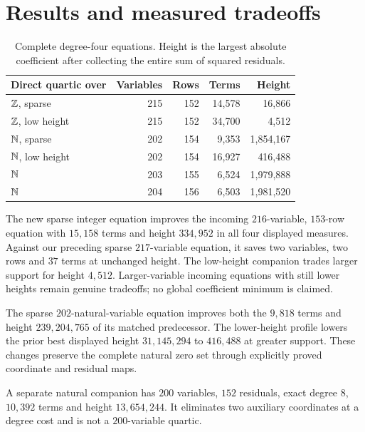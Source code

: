 \section{Results and measured tradeoffs}
\begin{table}[ht]
\centering\small
\begin{tabular}{lrrrr}
\toprule
Direct quartic over & Variables & Rows & Terms & Height\\
\midrule
$\mathbb Z$, sparse &215&152&14,578&16,866\\
$\mathbb Z$, low height &215&152&34,700&4,512\\
$\mathbb N$, sparse &202&154&9,353&1,854,167\\
$\mathbb N$, low height &202&154&16,927&416,488\\
$\mathbb N$ &203&155&6,524&1,979,888\\
$\mathbb N$ &204&156&6,503&1,981,520\\
\bottomrule
\end{tabular}
\caption{Complete degree-four equations. Height is the largest absolute
coefficient after collecting the entire sum of squared residuals.}
\end{table}
The new sparse integer equation improves the incoming $216$-variable,
$153$-row equation with $15{,}158$ terms and height $334{,}952$ in all four
displayed measures. Against our preceding sparse $217$-variable equation,
it saves two variables, two rows and $37$ terms at unchanged height.
The low-height companion trades larger support for height $4{,}512$.
Larger-variable incoming equations with still lower heights remain genuine
tradeoffs; no global coefficient minimum is claimed.

The sparse $202$-natural-variable equation improves both the $9{,}818$
terms and height $239{,}204{,}765$ of its matched predecessor. The lower-height
profile lowers the prior best displayed height $31{,}145{,}294$ to $416{,}488$
at greater support. These changes preserve the complete natural zero set
through explicitly proved coordinate and residual maps.

A separate natural companion has $200$ variables, $152$ residuals,
exact degree $8$, $10{,}392$ terms and height $13{,}654{,}244$.
It eliminates two auxiliary coordinates at a degree cost and is not a
$200$-variable quartic.

